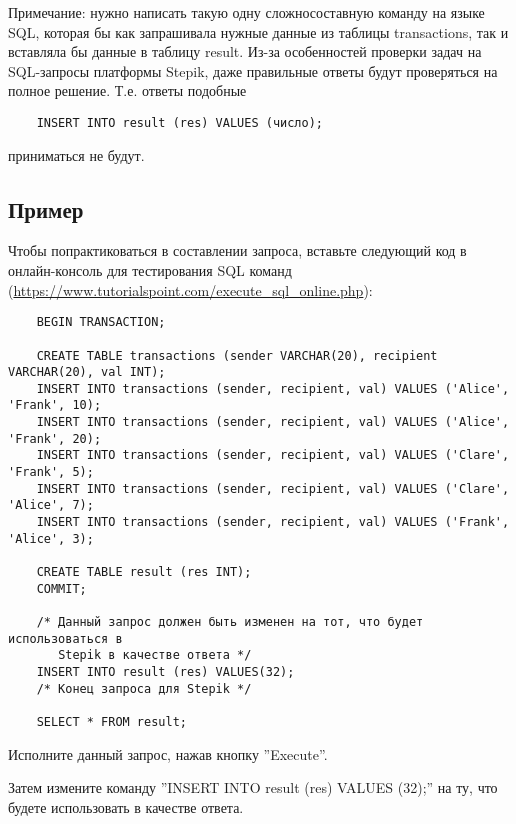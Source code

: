 Примечание: нужно написать такую одну сложносоставную команду на языке SQL, которая бы как запрашивала 
нужные данные из таблицы transactions, так и вставляла бы данные в таблицу result. Из-за особенностей 
проверки задач на SQL-запросы платформы Stepik, даже правильные ответы будут проверяться на полное решение. 
Т.е. ответы подобные

\begin{verbatim}
    INSERT INTO result (res) VALUES (число);
\end{verbatim}

приниматься не будут.

\subsection*{Пример}

Чтобы попрактиковаться в составлении запроса, вставьте следующий код в онлайн-консоль для тестирования SQL команд (\url{https://www.tutorialspoint.com/execute_sql_online.php}):

\begin{verbatim}
    BEGIN TRANSACTION;

    CREATE TABLE transactions (sender VARCHAR(20), recipient VARCHAR(20), val INT);
    INSERT INTO transactions (sender, recipient, val) VALUES ('Alice', 'Frank', 10);
    INSERT INTO transactions (sender, recipient, val) VALUES ('Alice', 'Frank', 20);
    INSERT INTO transactions (sender, recipient, val) VALUES ('Clare', 'Frank', 5);
    INSERT INTO transactions (sender, recipient, val) VALUES ('Clare', 'Alice', 7);
    INSERT INTO transactions (sender, recipient, val) VALUES ('Frank', 'Alice', 3);
    
    CREATE TABLE result (res INT);
    COMMIT;
    
    /* Данный запрос должен быть изменен на тот, что будет использоваться в 
       Stepik в качестве ответа */
    INSERT INTO result (res) VALUES(32);
    /* Конец запроса для Stepik */
    
    SELECT * FROM result;
\end{verbatim}

Исполните данный запрос, нажав кнопку ''Execute''.

Затем измените команду ''INSERT INTO result (res) VALUES (32);'' на ту, что будете использовать в качестве ответа.